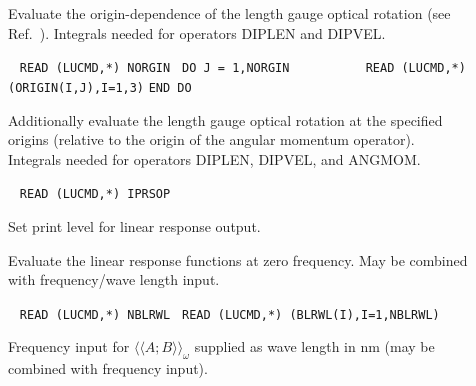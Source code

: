 \begin{description}
\item[] 
Evaluate the origin-dependence of the length gauge optical rotation
(see Ref.\ \cite{Pedersen:ORMVE}).
Integrals needed for operators DIPLEN and DIPVEL.

\item[] \verb| |\newline
  \verb|READ (LUCMD,*) NORGIN |\newline
  \verb|DO J = 1,NORGIN       |\newline
  \verb|   READ (LUCMD,*) (ORIGIN(I,J),I=1,3)|\newline
  \verb|END DO|

Additionally evaluate the length gauge optical rotation at the
specified origins (relative to the origin of the angular momentum
operator).
Integrals needed for operators DIPLEN, DIPVEL, and ANGMOM.
 
\item[] \verb| |\newline
   \verb|READ (LUCMD,*) IPRSOP|

Set print level for linear response output.

\item[]
Evaluate the linear response functions at zero frequency.
May be combined with frequency/wave length input.

\item[] \verb| |\newline
   \verb|READ (LUCMD,*) NBLRWL |\newline
   \verb|READ (LUCMD,*) (BLRWL(I),I=1,NBLRWL)|

Frequency input for $\langle\langle A;B \rangle\rangle_{\omega}$
supplied as wave length in nm (may be combined with frequency input).
 
\end{description}
